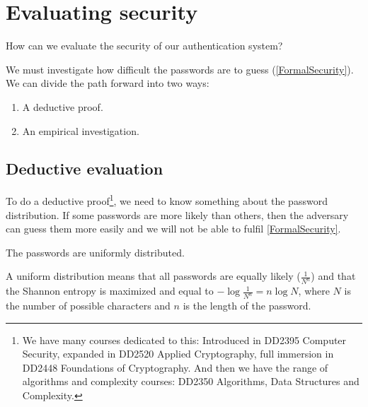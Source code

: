 \section{Evaluating security}

\begin{frame}
  \begin{exercise}
    How can we evaluate the security of our authentication system?
  \end{exercise}
\end{frame}

\begin{frame}
  \begin{solution}
    We must investigate how difficult the passwords are to guess 
    (\cref{FormalSecurity}).
    We can divide the path forward into two ways:
    \begin{enumerate}
      \item A deductive proof.
      \item An empirical investigation.
    \end{enumerate}
  \end{solution}
\end{frame}

\subsection{Deductive evaluation}

To do a deductive proof\footnote{%
  We have many courses dedicated to this:
  Introduced in DD2395 Computer Security,
  expanded in DD2520 Applied Cryptography,
  full immersion in DD2448 Foundations of Cryptography.
  And then we have the range of algorithms and complexity courses:
  \eg DD2350 Algorithms, Data Structures and Complexity.
}, we need to know something about the password distribution.
If some passwords are more likely than others, then the adversary can guess 
them more easily and we will not be able to fulfil \cref{FormalSecurity}.

\begin{frame}
  \begin{assumption}\label{AssumeUniform}
    The passwords are uniformly distributed.
  \end{assumption}
\end{frame}

A uniform distribution means that
all passwords are equally likely (\(\frac{1}{N^n}\))
and that
the Shannon entropy is maximized and equal to \(-\log \frac{1}{N^n} = n \log 
{N}\),
where \(N\) is the number of possible characters and \(n\) is the length of the 
password.

